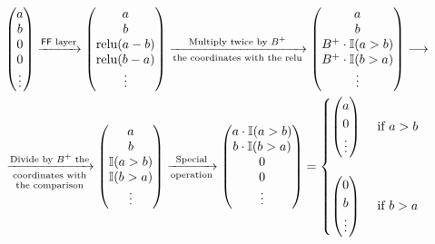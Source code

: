 \begin{align*}
    & \left( \begin{matrix} a \\ b \\ 0 \\ 0 \\ \vdots \\ \end{matrix} \right) 
    \xrightarrow{\FF \text{ layer}}
    \left( \begin{matrix} a \\ b \\ \relu(a-b) \\ \relu(b-a) \\ \vdots \\ \end{matrix} \right) 
    \xrightarrow[\text{the coordinates with the }\relu]{\text{Multiply twice by } \maxrep}
    \left( \begin{matrix} a \\ b \\ \maxrep \cdot \mathbb{I}(a>b) \\ \maxrep \cdot \mathbb{I}(b>a) \\ \vdots \\ \end{matrix} \right) \longrightarrow 
    \\
    & \xrightarrow[\text{\shortstack{coordinates with \\ the comparison}}]{\text{Divide by $\maxrep$ the}}
    \left( \begin{matrix} a \\ b \\ \mathbb{I}(a>b) \\ \mathbb{I}(b>a) \\ \vdots \\ \end{matrix} \right)
    \xrightarrow[\text{operation}]{\text{Special}}
    \left( \begin{matrix} a \cdot \mathbb{I}(a>b) \\ b \cdot \mathbb{I}(b>a) \\ 0 \\ 0 \\ \vdots \\ \end{matrix} \right)
    = \begin{cases}
        \left( \begin{matrix} a \\ 0 \\ \vdots \\ \end{matrix} \right) & \text{ if } a > b \\
        \\
        \left( \begin{matrix} 0 \\ b \\ \vdots \\ \end{matrix} \right) & \text{ if } b > a 
    \end{cases}
\end{align*}

